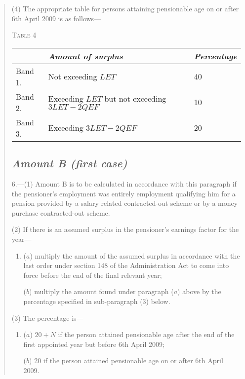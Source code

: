 \documentclass[12pt,a4paper]{article}
\begin{document}
\begin{quotation}
{}

(4) The appropriate table for persons attaining pensionable age on or after 6th April 2009 is as follows—

\medskip

\noindent\textsc{Table 4}

{\noindent\footnotesize
\begin{longtable}{lll}
\hline
&\itshape Amount of surplus	&\itshape Percentage\\
\hline
\endhead
\hline
\endlastfoot
Band 1. 	&Not exceeding $LET$	&40\\
Band 2. 	&Exceeding $LET$ but not exceeding $3LET - 2QEF$	&10\\
Band 3. 	&Exceeding $3LET - 2QEF$	&20\\
\end{longtable}

}

\subsection*{\itshape Amount B (first case)}

6.---(1) Amount B is to be calculated in accordance with this paragraph if the pensioner’s employment was entirely employment qualifying him for a pension provided by a salary related contracted-out scheme or by a money purchase contracted-out scheme.

(2) If there is an assumed surplus in the pensioner’s earnings factor for the year—
\begin{enumerate}\item[]
($a$) multiply the amount of the assumed surplus in accordance with the last order under section 148 of the Administration Act to come into force before the end of the final relevant year;

($b$) multiply the amount found under paragraph ($a$)  above by the percentage specified in sub-paragraph (3)  below.
\end{enumerate}

(3) The percentage is—
\begin{enumerate}\item[]
($a$) $20 + N$ if the person attained pensionable age after the end of the first appointed year but before 6th April 2009;

($b$) 20 if the person attained pensionable age on or after 6th April 2009. 
\end{enumerate}


\end{quotation}
\end{document}
